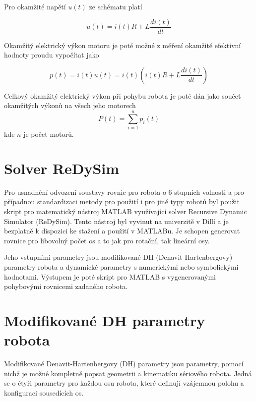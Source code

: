 Pro okamžité napětí $u(t)$ ze schématu platí 

\begin{equation}
u(t) = i(t)R + L\frac{di(t)}{dt}
\label{motor_voltage_eq}
\end{equation}  

Okamžitý elektrický výkon motoru je poté možné z měření okamžité efektivní hodnoty proudu vypočítat jako
 
\begin{equation}
p(t) = i(t)u(t) = i(t)\left(i(t)R + L\frac{di(t)}{dt}\right)
\label{motor_power_eq}
\end{equation} 

Celkový okamžitý elektrický výkon při pohybu robota je poté dán jako součet okamžitých výkonů na všech jeho motorech
\begin{equation}
P(t) = \sum_{i=1}^{n} p_i(t)
\label{robot_motor_power_eq}
\end{equation} 
kde $n$ je počet motorů.

\section{Solver ReDySim}

Pro usnadnění odvození soustavy rovnic pro robota o 6 stupních volnosti a pro případnou standardizaci metody pro použití i pro jiné typy robotů byl použit skript pro matematický nástroj MATLAB využívající solver Recursive Dynamic Simulator (ReDySim)\cite{redysim}. Tento nástroj byl vyvinut na univerzitě v Dillí a je bezplatně k dispozici ke stažení a použití v MATLABu. Je schopen generovat rovnice pro libovolný počet os a to jak pro rotační, tak lineární osy. 

Jeho vstupními parametry jsou modifikované DH (Denavit-Hartenbergovy) parametry robota a dynamické parametry s numerickými nebo symbolickými hodnotami. Výstupem je poté skript pro MATLAB s vygenerovanými pohybovými rovnicemi zadaného robota.  

\section{Modifikované DH parametry robota}

Modifikované Denavit-Hartenbergovy (DH) parametry jsou parametry, pomocí nichž je možné kompletně popsat geometrii a kinematiku sériového robota. Jedná se o čtyři parametry pro každou osu robota, které definují vzájemnou polohu a konfiguraci sousedících os. 

